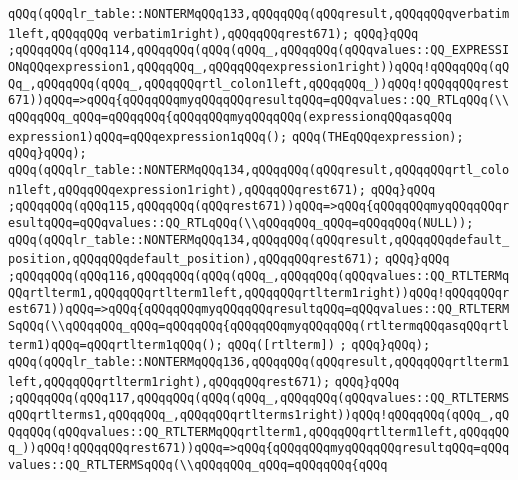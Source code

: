 \verb|qQQq(qQQqlr_table::NONTERMqQQq133,qQQqqQQq(qQQqresult,qQQqqQQqverbatim1left,qQQqqQQq|\newline
\verb|verbatim1right),qQQqqQQqrest671);|\newline
\verb|qQQq}qQQq|\newline
\verb|;qQQqqQQq(qQQq114,qQQqqQQq(qQQq(qQQq_,qQQqqQQq(qQQqvalues::QQ_EXPRESSIONqQQqexpression1,qQQqqQQq_,qQQqqQQqexpression1right))qQQq!qQQqqQQq(qQQq_,qQQqqQQq(qQQq_,qQQqqQQqrtl_colon1left,qQQqqQQq_))qQQq!qQQqqQQqrest671))qQQq=>qQQq{qQQqqQQqmyqQQqqQQqresultqQQq=qQQqvalues::QQ_RTLqQQq(\\qQQqqQQq_qQQq=qQQqqQQq{qQQqqQQqmyqQQqqQQq(expressionqQQqasqQQq|\newline
\verb|expression1)qQQq=qQQqexpression1qQQq();|\newline
\verb|qQQq(THEqQQqexpression);|\newline
\verb|qQQq}qQQq);|\newline
\verb|qQQq(qQQqlr_table::NONTERMqQQq134,qQQqqQQq(qQQqresult,qQQqqQQqrtl_colon1left,qQQqqQQqexpression1right),qQQqqQQqrest671);|\newline
\verb|qQQq}qQQq|\newline
\verb|;qQQqqQQq(qQQq115,qQQqqQQq(qQQqrest671))qQQq=>qQQq{qQQqqQQqmyqQQqqQQqresultqQQq=qQQqvalues::QQ_RTLqQQq(\\qQQqqQQq_qQQq=qQQqqQQq(NULL));|\newline
\verb|qQQq(qQQqlr_table::NONTERMqQQq134,qQQqqQQq(qQQqresult,qQQqqQQqdefault_position,qQQqqQQqdefault_position),qQQqqQQqrest671);|\newline
\verb|qQQq}qQQq|\newline
\verb|;qQQqqQQq(qQQq116,qQQqqQQq(qQQq(qQQq_,qQQqqQQq(qQQqvalues::QQ_RTLTERMqQQqrtlterm1,qQQqqQQqrtlterm1left,qQQqqQQqrtlterm1right))qQQq!qQQqqQQqrest671))qQQq=>qQQq{qQQqqQQqmyqQQqqQQqresultqQQq=qQQqvalues::QQ_RTLTERMSqQQq(\\qQQqqQQq_qQQq=qQQqqQQq{qQQqqQQqmyqQQqqQQq(rtltermqQQqasqQQqrtlterm1)qQQq=qQQqrtlterm1qQQq();|\newline
\verb|qQQq([rtlterm])|\newline
\verb|;|\newline
\verb|qQQq}qQQq);|\newline
\verb|qQQq(qQQqlr_table::NONTERMqQQq136,qQQqqQQq(qQQqresult,qQQqqQQqrtlterm1left,qQQqqQQqrtlterm1right),qQQqqQQqrest671);|\newline
\verb|qQQq}qQQq|\newline
\verb|;qQQqqQQq(qQQq117,qQQqqQQq(qQQq(qQQq_,qQQqqQQq(qQQqvalues::QQ_RTLTERMSqQQqrtlterms1,qQQqqQQq_,qQQqqQQqrtlterms1right))qQQq!qQQqqQQq(qQQq_,qQQqqQQq(qQQqvalues::QQ_RTLTERMqQQqrtlterm1,qQQqqQQqrtlterm1left,qQQqqQQq_))qQQq!qQQqqQQqrest671))qQQq=>qQQq{qQQqqQQqmyqQQqqQQqresultqQQq=qQQqvalues::QQ_RTLTERMSqQQq(\\qQQqqQQq_qQQq=qQQqqQQq{qQQq|\newline
